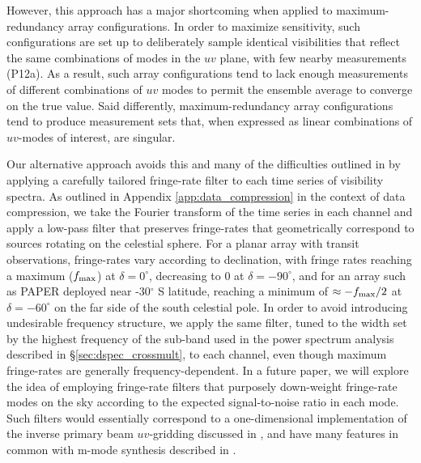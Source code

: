 \documentclass[twocolumn,numberedappendix]{emulateapj}
\begin{document}
However, this approach has a major shortcoming when applied to maximum-redundancy array configurations.
In order
to maximize sensitivity, such
configurations are set up to deliberately sample identical visibilities that reflect the same 
combinations of modes in the $uv$ plane, with few nearby measurements (P12a).  As a result,
such array configurations tend to lack enough measurements of different combinations of $uv$ modes
to permit the ensemble average to converge on the true value.  Said differently, maximum-redundancy
array configurations tend to produce measurement sets that, when expressed as linear combinations
of $uv$-modes of interest, are singular.

Our alternative approach avoids this and many of the difficulties outlined
in \citet{hazelton_et_al2013} by applying a carefully tailored
fringe-rate filter to each time series of visibility spectra.  As outlined in Appendix \ref{app:data_compression}
in the context of data compression, we
take the Fourier transform of the time series in each channel and apply a low-pass filter that preserves
fringe-rates that geometrically correspond to sources rotating on the celestial sphere.  
For a planar array with transit observations, fringe-rates vary according to declination, with fringe rates
reaching a maximum ($f_{\rm max}$) at 
$\delta=0^\circ$, decreasing to 0 at $\delta=-90^\circ$, and for an array such as PAPER deployed near
-30$^\circ$ S latitude, reaching a minimum of $\approx-f_{\rm max}/2$ at $\delta=-60^\circ$ on
the far side of the south celestial pole.
In order to
avoid introducing undesirable frequency structure, we apply the same filter, tuned to the width
set by the highest frequency of the sub-band used in the
power spectrum analysis described
in \S\ref{sec:dspec_crossmult}, to each channel,
even though maximum fringe-rates are generally frequency-dependent.
In a future paper, we will explore the idea
of employing fringe-rate filters that purposely down-weight fringe-rate modes on the sky according to
the expected signal-to-noise ratio in each mode.  Such filters would essentially correspond to a
one-dimensional implementation of the inverse primary beam $uv$-gridding discussed in \citet{morales_matejek2009},
and have many features in common with m-mode synthesis described in \citet{shaw_et_al2013}.
\end{document}
